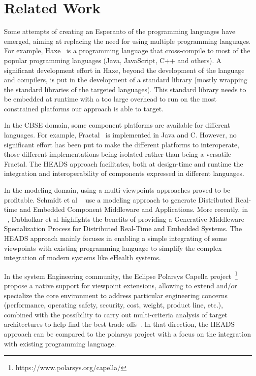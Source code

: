 \section{Related Work}

Some attempts of creating an Esperanto of the programming languages have emerged, aiming at replacing the need for using multiple programming languages. For example, Haxe~\cite{dasnois2011haxe} is a programming language that cross-compile to most of the popular programming languages (Java, JavaScript, C++ and others). A significant development effort in Haxe, beyond the development of the language and compilers, is put in the development of a standard library (mostly wrapping the standard libraries of the targeted languages). This standard library needs to be embedded at runtime with a too large overhead to run on the most constrained platforms our approach is able to target. 

In the CBSE domain, some component platforms are available for different languages. For example, Fractal~\cite{bruneton2006fractal} is implemented in Java and C. However, no significant effort has been put to make the different platforms to interoperate, those different implementations being isolated rather than being a versatile Fractal. The HEADS approach facilitates, both at design-time and runtime the integration and interoperability of components expressed in different languages.

In the modeling domain, using a multi-viewpoints approaches proved to be profitable. Schmidt et al ~\cite{DBLP:conf/middleware/GokhaleSLNW03} use a modeling approach to generate Distributed Real-time and Embedded Component Middleware and Applications. More recently, in  ~\cite{5753608}, Dabholkar et al highlights the benefits of providing a Generative Middleware Specialization Process for Distributed Real-Time and Embedded Systems.  The HEADS approach  mainly focuses in enabling a simple integrating of some viewpoints with existing programming language to simplify the complex integration of modern systems like eHealth systems. 

In the system Engineering community, the Eclipse Polarsys Capella project~\footnote{https://www.polarsys.org/capella/} propose a native support for viewpoint extensions, allowing to extend and/or specialize the core environment to address particular engineering concerns (performance, operating safety, security, cost, weight, product line, etc.), combined with the possibility to carry out multi-criteria analysis of target architectures to help find the best trade-offs~\cite{voirin2013arcadia}. In that direction, the HEADS approach can be compared to the polarsys project with a focus on the integration with existing programming language.

